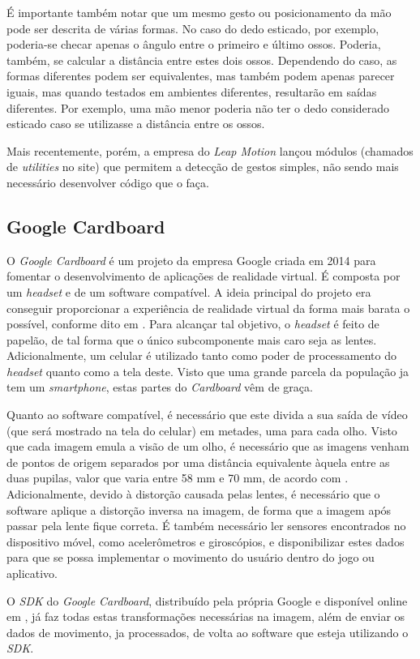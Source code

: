É importante também notar que um mesmo gesto ou posicionamento
da mão pode ser descrita de várias formas. No caso do dedo esticado, 
por exemplo, poderia-se checar apenas o ângulo entre o primeiro e 
último ossos. Poderia, também, se calcular a distância entre estes
dois ossos. Dependendo do caso, as formas diferentes podem ser 
equivalentes, mas também podem apenas parecer iguais, mas quando
testados em ambientes diferentes, resultarão em saídas diferentes.
Por exemplo, uma mão menor poderia não ter o dedo considerado esticado
caso se utilizasse a distância entre os ossos.

Mais recentemente, porém, a empresa do \textit{Leap Motion} 
lançou módulos (chamados de \textit{utilities} no site) 
que permitem a detecção de gestos simples, não sendo 
mais necessário desenvolver código que o faça.

\subsection{Google Cardboard}\label{subsec-teo-google-cardboard}

O \textit{Google Cardboard} é um projeto da empresa Google criada em 2014 para 
fomentar o desenvolvimento de aplicações de realidade virtual. É composta por um 
\textit{headset} e de um software compatível. A ideia principal do projeto era
conseguir proporcionar a experiência de realidade virtual da forma mais barata 
o possível, conforme dito em \cite{cnet:2016:google-cardboard}. Para 
alcançar tal objetivo, o \textit{headset} é feito de papelão, 
de tal forma que o único subcomponente mais caro seja as lentes. Adicionalmente, 
um celular é utilizado tanto como poder de processamento do \textit{headset} 
quanto como a tela deste. Visto que uma grande parcela da população ja tem um 
\textit{smartphone}, estas partes do \textit{Cardboard} vêm de graça.

Quanto ao software compatível, é necessário que este divida a sua saída de 
vídeo (que será mostrado na tela do celular) em metades, uma para cada olho. 
Visto que cada imagem emula a visão de um olho, é necessário que as imagens 
venham de pontos de origem separados por uma distância equivalente àquela entre 
as duas pupilas, valor que varia entre 58 mm e 70 mm, de acordo com
\cite{dodgson:2004:svariation}. Adicionalmente, devido à distorção causada 
pelas lentes, é necessário que o software aplique a distorção inversa na imagem, 
de forma que a imagem após passar pela lente fique correta. É também necessário 
ler sensores encontrados no dispositivo móvel, como acelerômetros e giroscópios, 
e disponibilizar estes dados para que se possa implementar o movimento do 
usuário dentro do jogo ou aplicativo.

O \textit{SDK} do \textit{Google Cardboard}, distribuído pela própria Google e disponível online 
em \cite{google:2016:cardboardSDK}, já faz todas estas transformações necessárias 
na imagem, além de enviar os dados de movimento, ja processados, de volta ao
software que esteja utilizando o \textit{SDK}.
